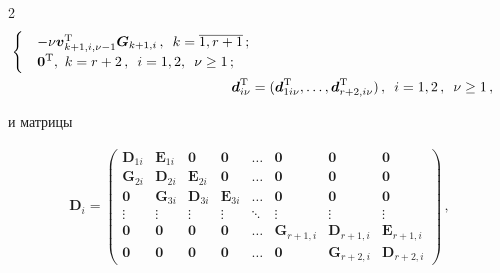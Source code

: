\begin{multicols}{2}
\begin{align*}
\begin{cases}
& -\nu \boldsymbol{v}_{k+1,i,\nu-1}^{\mathrm{T}}\boldsymbol{G}_{k+1,i}\,,\enskip k=\overline{1,r+1}\,;\\

& \boldsymbol{0}^{\mathrm{T}},\,\, k=r+2\,,\enskip i=1,2,\enskip \nu\geq 1\,;

\end{cases}\\

\boldsymbol{d}_{i\nu}^{\mathrm{T}}&=(\boldsymbol{d}_{1i\nu}^{\mathrm{T}},\ldots,

\boldsymbol{d}_{r+2,i\nu}^{\mathrm{T}})\,,\enskip i=1,2\,,\enskip \nu\geq 1\,,

\end{align*}

и матрицы

{\small

\begin{multline*}

\boldsymbol{D}_{i}=

\begin{pmatrix}

\boldsymbol{D}_{1i} &\boldsymbol{E}_{1i} & \boldsymbol{0} &

\boldsymbol{0} & \ldots &\boldsymbol{0} &\boldsymbol{0} &\boldsymbol{0}\\

\boldsymbol{G}_{2i} & \boldsymbol{D}_{2i} & \boldsymbol{E}_{2i} &

\boldsymbol{0} & \ldots & \boldsymbol{0} &\boldsymbol{0} &\boldsymbol{0}\\

\boldsymbol{0} & \boldsymbol{G}_{3i} & \boldsymbol{D}_{3i} &

\boldsymbol{E}_{3i} & \ldots & \boldsymbol{0} & \boldsymbol{0} & \boldsymbol{0}\\

\vdots & \vdots & \vdots & \vdots & \ddots  & \vdots & \vdots & \vdots\\

\boldsymbol{0} & \boldsymbol{0} & \boldsymbol{0} & \boldsymbol{0} & \ldots &

\boldsymbol{G}_{r+1,i} & \boldsymbol{D}_{r+1,i} & \boldsymbol{E}_{r+1,i} \\

\boldsymbol{0} & \boldsymbol{0} & \boldsymbol{0} & \boldsymbol{0} & \ldots & \boldsymbol{0} & \boldsymbol{G}_{r+2,i} & \boldsymbol{D}_{r+2,i}

\end{pmatrix}\,,\\


\end{multline*}}
\end{multicols}
